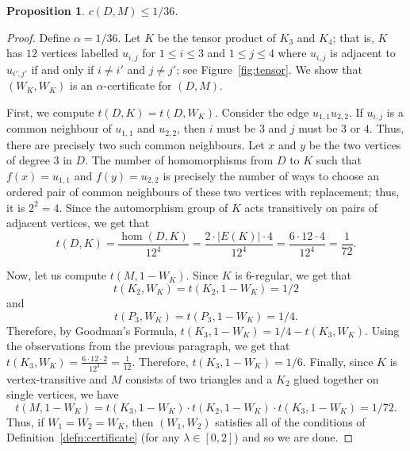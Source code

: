 \documentclass[12pt]{article}
\numberwithin{equation}{section}
\newtheorem{prop}[equation]{Proposition}
\theoremstyle{definition}
\theoremstyle{remark}
\begin{document}
\begin{prop}
\label{prop:D,Mupper}
$c(D,M)\leq 1/36$.
\end{prop}

\begin{proof}
Define $\alpha=1/36$. Let $K$ be the tensor product of $K_3$ and $K_4$; that is, $K$ has $12$ vertices labelled $u_{i,j}$ for $1\leq i\leq 3$ and $1\leq j\leq 4$ where $u_{i,j}$ is adjacent to $u_{i',j'}$ if and only if $i\neq i'$ and $j\neq j'$; see Figure~\ref{fig:tensor}. We show that $(W_K,W_K)$ is an $\alpha$-certificate for $(D,M)$. 

First, we compute $t(D,K)=t(D,W_K)$. Consider the edge $u_{1,1}u_{2,2}$. If $u_{i,j}$ is a common neighbour of $u_{1,1}$ and $u_{2,2}$, then $i$ must be $3$ and $j$ must be $3$ or $4$. Thus, there are precisely two such common neighbours. Let $x$ and $y$ be the two vertices of degree $3$ in $D$. The number of homomorphisms from $D$ to $K$ such that $f(x)=u_{1,1}$ and $f(y)=u_{2,2}$ is precisely the number of ways to choose an ordered pair of common neighbours of these two vertices with replacement; thus, it is $2^2=4$. Since the automorphism group of $K$ acts transitively on pairs of adjacent vertices, we get that
\[t(D,K) = \frac{\hom(D,K)}{12^4} = \frac{2\cdot |E(K)|\cdot 4}{12^4} = \frac{6\cdot 12\cdot 4}{12^4}=\frac{1}{72}.\]

Now, let us compute $t(M,1-W_K)$. Since $K$ is $6$-regular, we get that 
\[t(K_2,W_K)=t(K_2,1-W_K)=1/2\]
and
\[t(P_3,W_K)=t(P_3,1-W_K)=1/4.\]
Therefore, by Goodman's Formula, $t(K_3,1-W_K) = 1/4 - t(K_3,W_K)$. Using the observations from the previous paragraph, we get that $t(K_3,W_K)=\frac{6\cdot 12\cdot 2}{12^3}=\frac{1}{12}$. Therefore, $t(K_3,1-W_K)=1/6$. Finally, since $K$ is vertex-transitive and $M$ consists of two triangles and a $K_2$ glued together on single vertices, we have
\[t(M,1-W_K) = t(K_3,1-W_K)\cdot t(K_2,1-W_K)\cdot t(K_3,1-W_K)=1/72.\]
Thus, if $W_1=W_2=W_K$, then $(W_1,W_2)$ satisfies all of the conditions of Definition~\ref{defn:certificate} (for any $\lambda\in [0,2]$) and so we are done.
\end{proof}
\end{document}
